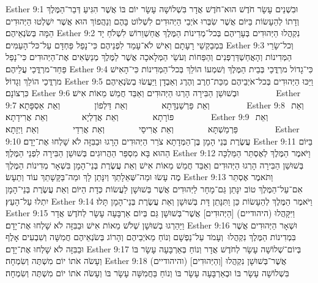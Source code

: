 Esther 9:1	וּבִשְׁנֵים עָשָׂר חֹדֶשׁ הוּא־חֹדֶשׁ אֲדָר בִּשְׁלוֹשָׁה עָשָׂר יוֹם בּוֹ אֲשֶׁר הִגִּיעַ דְּבַר־הַמֶּלֶךְ וְדָתוֹ לְהֵעָשׂוֹת בַּיּוֹם אֲשֶׁר שִׂבְּרוּ אֹיְבֵי הַיְּהוּדִים לִשְׁלוֹט בָּהֶם וְנַהֲפוֹךְ הוּא אֲשֶׁר יִשְׁלְטוּ הַיְּהוּדִים הֵמָּה בְּשֹׂנְאֵיהֶם׃
Esther 9:2	נִקְהֲלוּ הַיְּהוּדִים בְּעָרֵיהֶם בְּכל־מְדִינוֹת הַמֶּלֶךְ אֲחַשְׁוֵרוֹשׁ לִשְׁלֹחַ יָד בִּמְבַקְשֵׁי רָעָתָם וְאִישׁ לֹא־עָמַד לִפְנֵיהֶם כִּי־נָפַל פַּחְדָּם עַל־כּל־הָעַמִּים׃
Esther 9:3	וְכל־שָׂרֵי הַמְּדִינוֹת וְהָאֲחַשְׁדַּרְפְּנִים וְהַפַּחוֹת וְעֹשֵׂי הַמְּלָאכָה אֲשֶׁר לַמֶּלֶךְ מְנַשְּׂאִים אֶת־הַיְּהוּדִים כִּי־נָפַל פַּחַד־מרְדֳּכַי עֲלֵיהֶם׃
Esther 9:4	כִּי־גָדוֹל מרְדֳּכַי בְּבֵית הַמֶּלֶךְ וְשׁמְעוֹ הוֹלֵךְ בְּכל־הַמְּדִינוֹת כִּי־הָאִישׁ מרְדֳּכַי הוֹלֵךְ וְגָדוֹל׃
Esther 9:5	וַיַּכּוּ הַיְּהוּדִים בְּכל־אֹיְבֵיהֶם מַכַּת־חֶרֶב וְהֶרֶג וְאַבְדָן וַיַּעֲשׂוּ בְשֹׂנְאֵיהֶם כִּרְצוֹנָם׃
Esther 9:6	וּבְשׁוּשַׁן הַבִּירָה הָרְגוּ הַיְּהוּדִים וְאַבֵּד חֲמֵשׁ מֵאוֹת אִישׁ׃        
Esther 9:7	וְאֵת  פַּרְשַׁנְדָּתָא        וְאֵת  דַּלְפוֹן        וְאֵת  אַסְפָּתָא׃        
Esther 9:8	וְאֵת  פּוֹרָתָא        וְאֵת  אֲדַלְיָא        וְאֵת  אֲרִידָתָא׃        
Esther 9:9	וְאֵת  פַּרְמַשְׁתָּא        וְאֵת  אֲרִיסַי        וְאֵת  אֲרִדַי        וְאֵת  וַיְזָתָא׃        
Esther 9:10	עֲשֶׂרֶת בְּנֵי הָמָן בֶּן־הַמְּדָתָא צֹרֵר הַיְּהוּדִים הָרָגוּ וּבַבִּזָּה לֹא שָׁלְחוּ אֶת־יָדָם׃
Esther 9:11	בַּיּוֹם הַהוּא בָּא מִסְפַּר הַהֲרוּגִים בְּשׁוּשַׁן הַבִּירָה לִפְנֵי הַמֶּלֶךְ׃
Esther 9:12	וַיֹּאמֶר הַמֶּלֶךְ לְאֶסְתֵּר הַמַּלְכָּה בְּשׁוּשַׁן הַבִּירָה הָרְגוּ הַיְּהוּדִים וְאַבֵּד חֲמֵשׁ מֵאוֹת אִישׁ וְאֵת עֲשֶׂרֶת בְּנֵי־הָמָן בִּשְׁאָר מְדִינוֹת הַמֶּלֶךְ מֶה עָשׂוּ וּמַה־שְּׁאֵלָתֵךְ וְיִנָּתֵן לָךְ וּמַה־בַּקָּשָׁתֵךְ עוֹד וְתֵעָשׂ׃
Esther 9:13	וַתֹּאמֶר אֶסְתֵּר אִם־עַל־הַמֶּלֶךְ טוֹב יִנָּתֵן גַּם־מָחָר לַיְּהוּדִים אֲשֶׁר בְּשׁוּשָׁן לַעֲשׂוֹת כְּדָת הַיּוֹם וְאֵת עֲשֶׂרֶת בְּנֵי־הָמָן יִתְלוּ עַל־הָעֵץ׃
Esther 9:14	וַיֹּאמֶר הַמֶּלֶךְ לְהֵעָשׂוֹת כֵּן וַתִּנָּתֵן דָּת בְּשׁוּשָׁן וְאֵת עֲשֶׂרֶת בְּנֵי־הָמָן תָּלוּ׃
Esther 9:15	וַיִּקָּהֲלוּ (היהודיים) [הַיְּהוּדִים] אֲשֶׁר־בְּשׁוּשָׁן גַּם בְּיוֹם אַרְבָּעָה עָשָׂר לְחֹדֶשׁ אֲדָר וַיַּהַרְגוּ בְשׁוּשָׁן שְׁלֹשׁ מֵאוֹת אִישׁ וּבַבִּזָּה לֹא שָׁלְחוּ אֶת־יָדָם׃
Esther 9:16	וּשְׁאָר הַיְּהוּדִים אֲשֶׁר בִּמְדִינוֹת הַמֶּלֶךְ נִקְהֲלוּ  וְעָמֹד עַל־נַפְשָׁם וְנוֹחַ מֵאֹיְבֵיהֶם וְהָרוֹג בְּשֹׂנְאֵיהֶם חֲמִשָּׁה וְשִׁבְעִים אָלֶף וּבַבִּזָּה לֹא שָׁלְחוּ אֶת־יָדָם׃
Esther 9:17	בְּיוֹם־שְׁלוֹשָׁה עָשָׂר לְחֹדֶשׁ אֲדָר וְנוֹחַ בְּאַרְבָּעָה עָשָׂר בּוֹ וְעָשֹׂה אֹתוֹ יוֹם מִשְׁתֶּה וְשִׂמְחָה׃
Esther 9:18	(והיהודיים) [וְהַיְּהוּדִים] אֲשֶׁר־בְּשׁוּשָׁן נִקְהֲלוּ בִּשְׁלוֹשָׁה עָשָׂר בּוֹ וּבְאַרְבָּעָה עָשָׂר בּוֹ וְנוֹחַ בַּחֲמִשָּׁה עָשָׂר בּוֹ וְעָשֹׂה אֹתוֹ יוֹם מִשְׁתֶּה וְשִׂמְחָה׃
